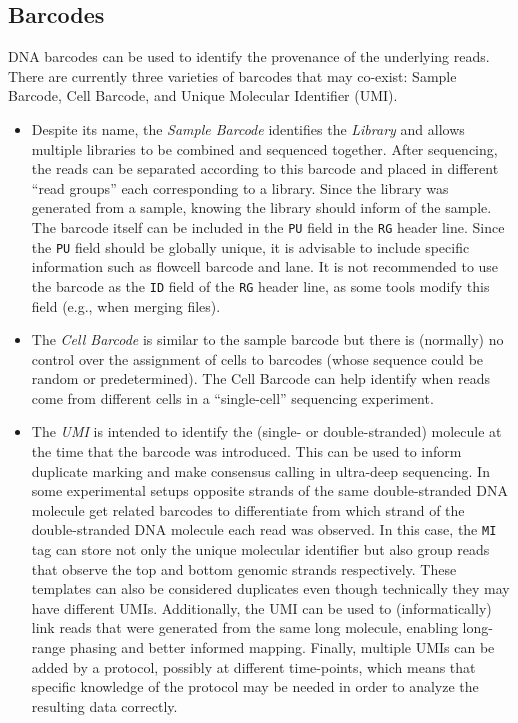 \documentclass[10pt]{article}
\begin{document}
\subsection{Barcodes}
DNA barcodes can be used to identify the provenance of the underlying reads.
There are currently three varieties of barcodes that may co-exist: Sample Barcode, Cell Barcode, and Unique Molecular Identifier (UMI).
\begin{itemize}
\item
Despite its name, the \emph{Sample Barcode} identifies the \emph{Library} and allows multiple libraries to be combined and sequenced together.
After sequencing, the reads can be separated according to this barcode and placed in different ``read groups'' each corresponding to a library.
Since the library was generated from a sample, knowing the library should inform of the sample.
The barcode itself can be included in the {\tt PU} field in the {\tt RG} header line.
Since the {\tt PU} field should be globally unique, it is advisable to include specific information such as flowcell barcode and lane.
It is not recommended to use the barcode as the {\tt ID} field of the {\tt RG} header line, as some tools modify this field (e.g., when merging files).
\item
The \emph{Cell Barcode} is similar to the sample barcode but there is (normally) no control over the assignment of cells to barcodes (whose sequence could be random or predetermined).
The Cell Barcode can help identify when reads come from different cells in a ``single-cell'' sequencing experiment.

\item
The \emph{UMI} is intended to identify the (single- or double-stranded) molecule at the time that the barcode was introduced.
This can be used to inform duplicate marking and make consensus calling in ultra-deep sequencing.
In some experimental setups opposite strands of the same double-stranded DNA molecule get related barcodes to differentiate from which strand of the double-stranded DNA molecule each read was observed.
In this case, the {\tt MI} tag can store not only the unique molecular identifier but also group reads that observe the top and bottom genomic strands respectively.
These templates can also be considered duplicates even though technically they may have different UMIs.
Additionally, the UMI can be used to (informatically) link reads that were generated from the same long molecule, enabling long-range phasing and better informed mapping.
Finally, multiple UMIs can be added by a protocol, possibly at different time-points, which means that specific knowledge of the protocol may be needed in order to analyze the resulting data correctly.
\end{itemize}
\end{document}
